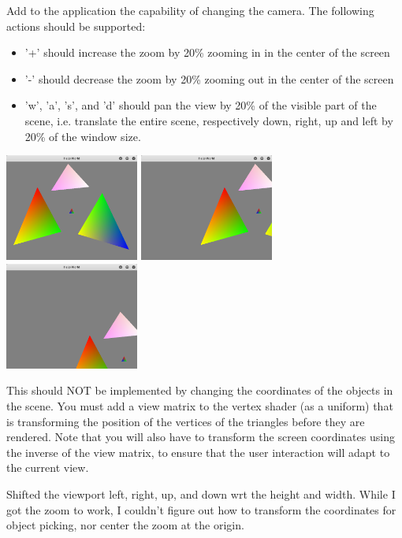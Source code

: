 \documentclass[11pt]{article}
\begin{document}
Add to the application the capability of changing the camera. The following actions should be supported:
\begin{itemize}
	\item '+' should increase the zoom by 20\% zooming in in the center of the screen
	\item '-' should decrease the zoom by 20\% zooming out in the center of the screen
	\item 'w', 'a', 's', and 'd' should pan the view by 20\% of the visible part of the scene, i.e. translate the entire scene, respectively down, right, up and left by 20\% of the window size.
\end{itemize}
\includegraphics[width=0.33\textwidth]{pan.png}
\includegraphics[width=0.33\textwidth]{pan1.png}
\includegraphics[width=0.33\textwidth]{pan2.png}

This should NOT be implemented by changing the coordinates of the objects in the scene. You must add a view matrix to the vertex shader (as a uniform) that is transforming the position of the vertices of the triangles before they are rendered. Note that you will also have to transform the screen coordinates using the inverse of the view matrix, to ensure that the user interaction will adapt to the current view.

Shifted the viewport left, right, up, and down wrt the height and width.
While I got the zoom to work, I couldn't figure out how to transform the coordinates for object picking, nor center the zoom at the origin.
\end{document}

